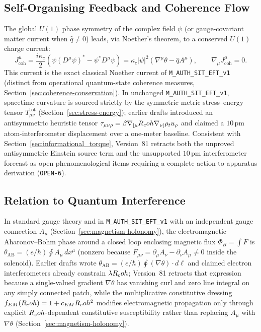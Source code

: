 \subsection{Self-Organising Feedback and Coherence Flow}

The global $U(1)$ phase symmetry of the complex field $\psi$ (or gauge-covariant matter current when $\hat{q} \neq 0$) leads, via Noether's theorem, to a conserved $U(1)$ charge current:
\[
    J^\mu_{\mathrm{coh}} = \frac{i\kappa_c}{2} \left( \psi (D^\mu \psi)^* - \psi^* D^\mu \psi \right) = \kappa_c |\psi|^2 (\nabla^\mu \theta - \hat{q} A^\mu),
    \qquad
    \nabla_\mu J^\mu_{\mathrm{coh}} = 0.
\]
This current is the exact classical Noether current of \texttt{M\_AUTH\_SIT\_EFT\_v1} (distinct from operational quantum-state coherence measures, Section~\ref{sec:coherence-conservation}). In unchanged \texttt{M\_AUTH\_SIT\_EFT\_v1}, spacetime curvature is sourced strictly by the symmetric metric stress--energy tensor $T_{\mu\nu}^{\mathrm{tot}}$ (Section~\ref{sec:stress-energy}); earlier drafts introduced an antisymmetric heuristic tensor $\tau_{\mu\nu\rho} = \beta\nabla_{[\mu}R_coh\nabla_{\nu]}\rho_t u_\rho$ and claimed a $10\,\mathrm{pm}$ atom-interferometer displacement over a one-meter baseline. Consistent with Section~\ref{sec:informational_torque}, Version~81 retracts both the unproved antisymmetric Einstein source term and the unsupported $10\,\mathrm{pm}$ interferometer forecast as open phenomenological items requiring a complete action-to-apparatus derivation (\texttt{OPEN-6}).

\subsection{Relation to Quantum Interference}

In standard gauge theory and in \texttt{M\_AUTH\_SIT\_EFT\_v1} with an independent gauge connection $A_\mu$ (Section~\ref{sec:magnetism-holonomy}), the electromagnetic Aharonov--Bohm phase around a closed loop enclosing magnetic flux $\Phi_B = \int F$ is $\theta_{\mathrm{AB}} = (e/\hbar)\oint A_\mu\,dx^\mu$ (nonzero because $F_{\mu\nu} = \partial_\mu A_\nu - \partial_\nu A_\mu \neq 0$ inside the solenoid). Earlier drafts wrote $\theta_{\mathrm{AB}} = (e/\hbar)\oint (\nabla\theta)\cdot d\boldsymbol{\ell}$ and claimed electron interferometers already constrain $\lambda R_coh$; Version~81 retracts that expression because a single-valued gradient $\nabla\theta$ has vanishing curl and zero line integral on any simply connected patch, while the multiplicative constitutive dressing $f_{EM}(R_coh) = 1 + c_{EM}R_coh^2$ modifies electromagnetic propagation only through explicit $R_coh$-dependent constitutive susceptibility rather than replacing $A_\mu$ with $\nabla\theta$ (Section~\ref{sec:magnetism-holonomy}).


